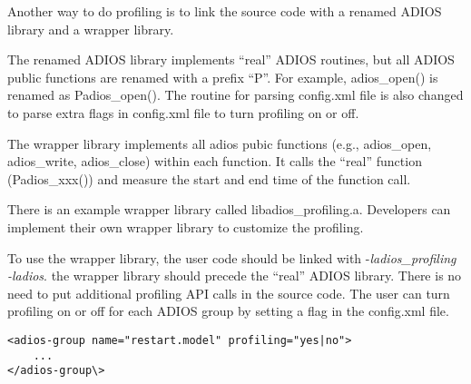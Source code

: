 Another way to do profiling is to link the source code with a renamed ADIOS library 
and a wrapper library. 

The renamed ADIOS library implements ``real'' ADIOS routines, but all ADIOS public 
functions are renamed with a prefix ``P''. For example, adios\_open() is renamed 
as Padios\_open(). The routine for parsing config.xml file is also changed to parse 
extra flags in config.xml file to turn profiling on or off.

The wrapper library implements all adios pubic functions (e.g., adios\_open, adios\_write, 
adios\_close) within each function. It calls the ``real'' function (Padios\_xxx()) 
and measure the start and end time of the function call. 

There is an example wrapper library called libadios\_profiling.a. Developers can 
implement their own wrapper library to customize the profiling.

To use the wrapper library, the user code should be linked with -\textit{ladios\_profiling 
-ladios}. the wrapper library should precede the ``real'' ADIOS library. There 
is no need to put additional profiling API calls in the source code. The user can 
turn profiling on or off for each ADIOS group by setting a flag in the config.xml 
file.

\begin{lstlisting}
<adios-group name="restart.model" profiling="yes|no">
    ...
</adios-group\>
\end{lstlisting}
